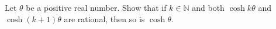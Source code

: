Let $\theta$ be a positive real number. Show that if $k\in \mathbb{N}$ and both $\cosh k \theta$ and $\cosh(k+1) \theta$ are rational, then so is $\cosh \theta$.